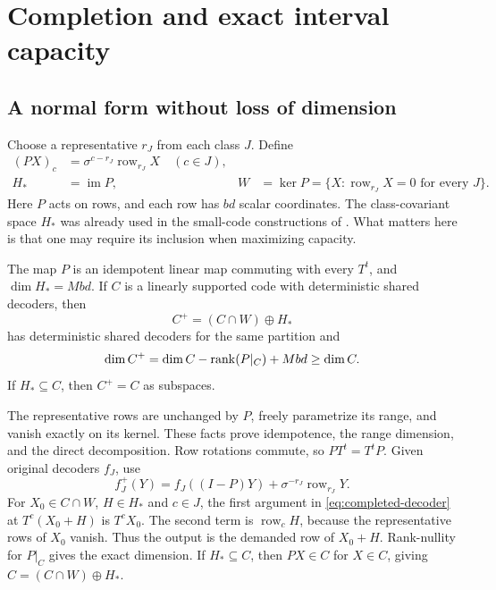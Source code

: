 \section{Completion and exact interval capacity}\label{sec:structure}

\subsection{A normal form without loss of dimension}

Choose a representative $r_J$ from each class $J$. Define
\begin{align*}
 (PX)_c&=\sigma^{c-r_J}\operatorname{row}_{r_J}X\quad(c\in J),\\
 H_*&=\operatorname{im}P,
 &W&=\ker P=\{X:\operatorname{row}_{r_J}X=0\text{ for every }J\}.
\end{align*}
Here $P$ acts on rows, and each row has $bd$ scalar coordinates.
The class-covariant space $H_*$ was already used in the small-code
constructions of \cite{SeventeenthPaper2026}. What matters here is that
one may require its inclusion when maximizing capacity.

\begin{theorem}\label{thm:completion}
The map $P$ is an idempotent linear map commuting with every $T^t$, and
$\dim H_*=Mbd$. If $C$ is a linearly supported code with deterministic
shared decoders, then
\[
 C^+=(C\cap W)\oplus H_*
\]
has deterministic shared decoders for the same partition and
\[
 \dim C^+=\dim C-\operatorname{rank}(P|_C)+Mbd\ge\dim C.
\]
If $H_*\subseteq C$, then $C^+=C$ as subspaces.
\end{theorem}
\begin{outline}
The representative rows are unchanged by $P$, freely parametrize its
range, and vanish exactly on its kernel. These facts prove idempotence,
the range dimension, and the direct decomposition. Row rotations commute,
so $PT^t=T^tP$. Given original decoders $f_J$, use
\begin{equation}\label{eq:completed-decoder}
 f_J^+(Y)=f_J((I-P)Y)+\sigma^{-r_J}\operatorname{row}_{r_J}Y.
\end{equation}
For $X_0\in C\cap W$, $H\in H_*$ and $c\in J$, the first argument
in \eqref{eq:completed-decoder} at $T^c(X_0+H)$ is $T^cX_0$.
The second term is $\operatorname{row}_cH$, because the representative
rows of $X_0$ vanish. Thus the output is the demanded row of $X_0+H$.
Rank-nullity for $P|_C$ gives the exact dimension. If $H_*\subseteq C$,
then $PX\in C$ for $X\in C$, giving $C=(C\cap W)\oplus H_*$.
\end{outline}

